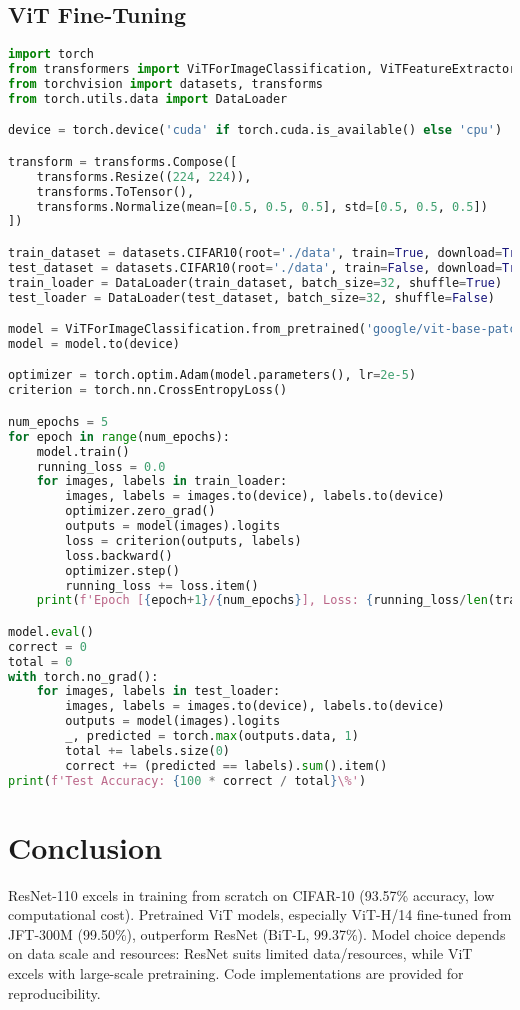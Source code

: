 \documentclass[UTF8]{report}
\theoremstyle{MyLineTheoremStyle} %
\theoremstyle{MyBlockTheoremStyle} %
\theoremstyle{MySubsubsectionStyle} %
\begin{document}
\subsection*{ViT Fine-Tuning}
\begin{lstlisting}[language=Python]
import torch
from transformers import ViTForImageClassification, ViTFeatureExtractor
from torchvision import datasets, transforms
from torch.utils.data import DataLoader

device = torch.device('cuda' if torch.cuda.is_available() else 'cpu')

transform = transforms.Compose([
    transforms.Resize((224, 224)),
    transforms.ToTensor(),
    transforms.Normalize(mean=[0.5, 0.5, 0.5], std=[0.5, 0.5, 0.5])
])

train_dataset = datasets.CIFAR10(root='./data', train=True, download=True, transform=transform)
test_dataset = datasets.CIFAR10(root='./data', train=False, download=True, transform=transform)
train_loader = DataLoader(train_dataset, batch_size=32, shuffle=True)
test_loader = DataLoader(test_dataset, batch_size=32, shuffle=False)

model = ViTForImageClassification.from_pretrained('google/vit-base-patch16-224-in21k', num_labels=10)
model = model.to(device)

optimizer = torch.optim.Adam(model.parameters(), lr=2e-5)
criterion = torch.nn.CrossEntropyLoss()

num_epochs = 5
for epoch in range(num_epochs):
    model.train()
    running_loss = 0.0
    for images, labels in train_loader:
        images, labels = images.to(device), labels.to(device)
        optimizer.zero_grad()
        outputs = model(images).logits
        loss = criterion(outputs, labels)
        loss.backward()
        optimizer.step()
        running_loss += loss.item()
    print(f'Epoch [{epoch+1}/{num_epochs}], Loss: {running_loss/len(train_loader):.4f}')

model.eval()
correct = 0
total = 0
with torch.no_grad():
    for images, labels in test_loader:
        images, labels = images.to(device), labels.to(device)
        outputs = model(images).logits
        _, predicted = torch.max(outputs.data, 1)
        total += labels.size(0)
        correct += (predicted == labels).sum().item()
print(f'Test Accuracy: {100 * correct / total}\%')
\end{lstlisting}

\section*{Conclusion}
ResNet-110 excels in training from scratch on CIFAR-10 (93.57\% accuracy, low computational cost). Pretrained ViT models, especially ViT-H/14 fine-tuned from JFT-300M (99.50\%), outperform ResNet (BiT-L, 99.37\%). Model choice depends on data scale and resources: ResNet suits limited data/resources, while ViT excels with large-scale pretraining. Code implementations are provided for reproducibility.
\end{document}
